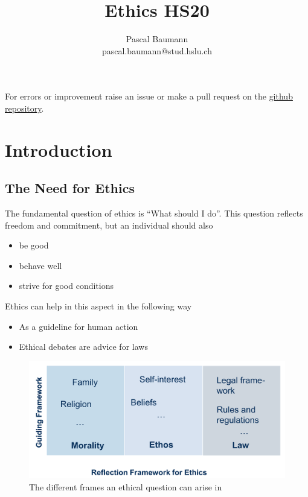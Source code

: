 \documentclass[11pt]{article}
\theoremstyle{definition}
\begin{document}
	
\title{Ethics HS20}
\author{Pascal Baumann\\pascal.baumann@stud.hslu.ch}
\maketitle

For errors or improvement raise an issue or make a pull request on the \href{https://github.com/KilnOfTheSecondFlame/mse_summaries}{github repository}.

\tableofcontents
\newpage

\section{Introduction}

\subsection{The Need for Ethics}
The fundamental question of ethics is \textquotedblleft What should I do\textquotedblright. This question reflects freedom and commitment, but an individual should also
\begin{itemize}[label=-, nosep]
	\item be good
	\item behave well
	\item strive for good conditions
\end{itemize}

\noindent
Ethics can help in this aspect in the following way
\begin{itemize}[nosep]
	\item As a guideline for human action
	\item Ethical debates are advice for laws
\end{itemize}

\begin{figure}[tbh]
	\centering
	\includegraphics[width=0.8\linewidth]{img/ethics_frame}
	\caption{The different frames an ethical question can arise in}
	\label{fig:ethicsframe}
\end{figure}
\end{document}
